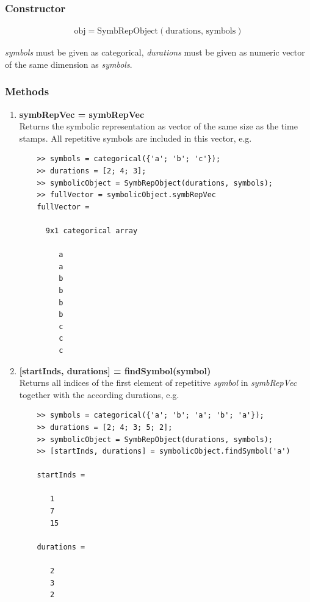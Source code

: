 \documentclass[a4]{scrreprt}
\begin{document}
\subsubsection{Constructor}

\begin{align*}
\text{obj} = \text{SymbRepObject}(\text{durations, }\text{symbols})
\end{align*}

\textit{symbols} must be given as categorical, \textit{durations} must be given as numeric vector of the same dimension as \textit{symbols}.

\subsubsection{Methods}

\begin{enumerate}
	
	\item \textbf{symbRepVec = symbRepVec}\\
	Returns the symbolic representation as vector of the same size as the time stamps. All repetitive symbols are included in this vector, e.g.	
	\begin{verbatim}
	>> symbols = categorical({'a'; 'b'; 'c'});
	>> durations = [2; 4; 3];
	>> symbolicObject = SymbRepObject(durations, symbols);
	>> fullVector = symbolicObject.symbRepVec
	fullVector = 
	
	  9x1 categorical array
	
	     a 
	     a 
	     b 
	     b 
	     b 
	     b 
	     c 
	     c 
	     c 
	\end{verbatim}
	
	\item \textbf{[startInds, durations] = findSymbol(symbol)}\\
	Returns all indices of the first element of repetitive \textit{symbol} in \textit{symbRepVec} together with the according durations, e.g.
	\begin{verbatim}
	>> symbols = categorical({'a'; 'b'; 'a'; 'b'; 'a'});
	>> durations = [2; 4; 3; 5; 2];
	>> symbolicObject = SymbRepObject(durations, symbols);
	>> [startInds, durations] = symbolicObject.findSymbol('a')
	
	startInds =
	
	   1
	   7
	   15	
	
	durations =
	
	   2
	   3
	   2
	\end{verbatim}
	

\end{enumerate}
\end{document}
